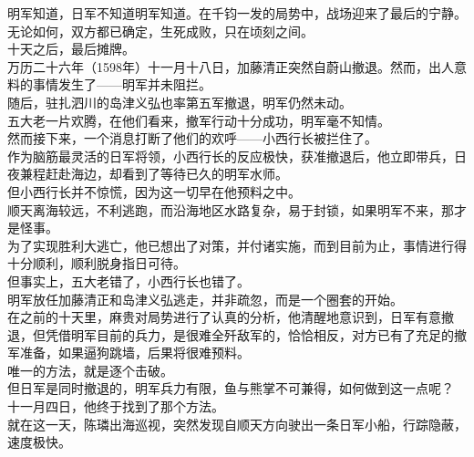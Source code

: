 \begin{multicols}{\theparacolNo}
明军知道，日军不知道明军知道。在千钧一发的局势中，战场迎来了最后的宁静。\\

无论如何，双方都已确定，生死成败，只在顷刻之间。\\

十天之后，最后摊牌。\\

万历二十六年（1598年）十一月十八日，加藤清正突然自蔚山撤退。然而，出人意料的事情发生了——明军并未阻拦。\\

随后，驻扎泗川的岛津义弘也率第五军撤退，明军仍然未动。\\

五大老一片欢腾，在他们看来，撤军行动十分成功，明军毫不知情。\\

然而接下来，一个消息打断了他们的欢呼——小西行长被拦住了。\\

作为脑筋最灵活的日军将领，小西行长的反应极快，获准撤退后，他立即带兵，日夜兼程赶赴海边，却看到了等待已久的明军水师。\\

但小西行长并不惊慌，因为这一切早在他预料之中。\\

顺天离海较远，不利逃跑，而沿海地区水路复杂，易于封锁，如果明军不来，那才是怪事。\\

为了实现胜利大逃亡，他已想出了对策，并付诸实施，而到目前为止，事情进行得十分顺利，顺利脱身指日可待。\\

但事实上，五大老错了，小西行长也错了。\\

明军放任加藤清正和岛津义弘逃走，并非疏忽，而是一个圈套的开始。\\

在之前的十天里，麻贵对局势进行了认真的分析，他清醒地意识到，日军有意撤退，但凭借明军目前的兵力，是很难全歼敌军的，恰恰相反，对方已有了充足的撤军准备，如果逼狗跳墙，后果将很难预料。\\

唯一的方法，就是逐个击破。\\

但日军是同时撤退的，明军兵力有限，鱼与熊掌不可兼得，如何做到这一点呢？\\

十一月四日，他终于找到了那个方法。\\

就在这一天，陈璘出海巡视，突然发现自顺天方向驶出一条日军小船，行踪隐蔽，速度极快。\\


\end{multicols}
